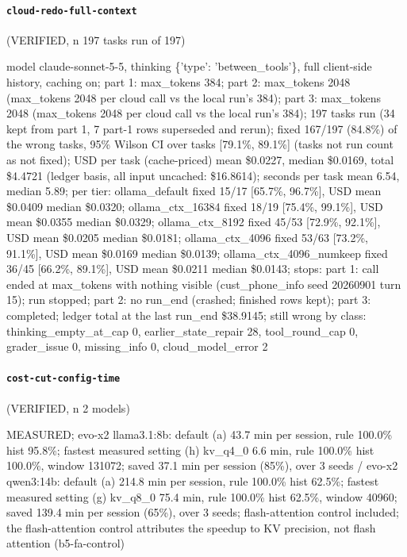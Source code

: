 \paragraph{\texttt{cloud-redo-full-context}} (VERIFIED, n 197 tasks run of 197)

{\footnotesize\raggedright model claude-sonnet-5-5, thinking \{'type': 'between\_tools'\}, full client-side history, caching on; part 1: max\_tokens 384; part 2: max\_tokens 2048 (max\_tokens 2048 per cloud call vs the local run's 384); part 3: max\_tokens 2048 (max\_tokens 2048 per cloud call vs the local run's 384); 197 tasks run (34 kept from part 1, 7 part-1 rows superseded and rerun); fixed 167/197 (84.8\%) of the wrong tasks, 95\% Wilson CI over tasks [79.1\%, 89.1\%] (tasks not run count as not fixed); USD per task (cache-priced) mean \$0.0227, median \$0.0169, total \$4.4721 (ledger basis, all input uncached: \$16.8614); seconds per task mean 6.54, median 5.89; per tier: ollama\_default fixed 15/17 [65.7\%, 96.7\%], USD mean \$0.0409 median \$0.0320; ollama\_ctx\_16384 fixed 18/19 [75.4\%, 99.1\%], USD mean \$0.0355 median \$0.0329; ollama\_ctx\_8192 fixed 45/53 [72.9\%, 92.1\%], USD mean \$0.0205 median \$0.0181; ollama\_ctx\_4096 fixed 53/63 [73.2\%, 91.1\%], USD mean \$0.0169 median \$0.0139; ollama\_ctx\_4096\_numkeep fixed 36/45 [66.2\%, 89.1\%], USD mean \$0.0211 median \$0.0143; stops: part 1: call ended at max\_tokens with nothing visible (cust\_phone\_info seed 20260901 turn 15); run stopped; part 2: no run\_end (crashed; finished rows kept); part 3: completed; ledger total at the last run\_end \$38.9145; still wrong by class: thinking\_empty\_at\_cap 0, earlier\_state\_repair 28, tool\_round\_cap 0, grader\_issue 0, missing\_info 0, cloud\_model\_error 2\par}

\paragraph{\texttt{cost-cut-config-time}} (VERIFIED, n 2 models)

{\footnotesize\raggedright MEASURED; evo-x2 llama3.1:8b: default (a) 43.7 min per session, rule 100.0\% hist 95.8\%; fastest measured setting (h) kv\_q4\_0 6.6 min, rule 100.0\% hist 100.0\%, window 131072; saved 37.1 min per session (85\%), over 3 seeds / evo-x2 qwen3:14b: default (a) 214.8 min per session, rule 100.0\% hist 62.5\%; fastest measured setting (g) kv\_q8\_0 75.4 min, rule 100.0\% hist 62.5\%, window 40960; saved 139.4 min per session (65\%), over 3 seeds; flash-attention control included; the flash-attention control attributes the speedup to KV precision, not flash attention (b5-fa-control)\par}

